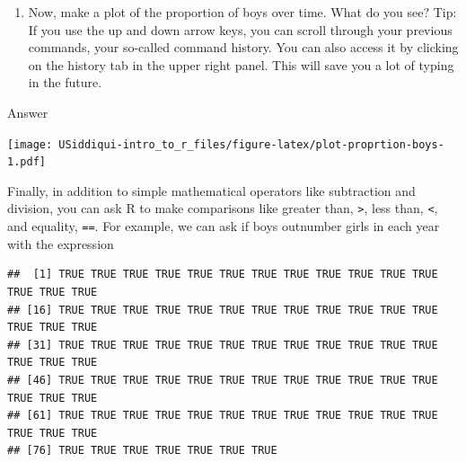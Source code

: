 \documentclass[
]{article}
\newenvironment{Shaded}{\begin{snugshade}}{\end{snugshade}}
\newcommand{\KeywordTok}[1]{\textcolor[rgb]{0.13,0.29,0.53}{\textbf{#1}}}
\newcommand{\NormalTok}[1]{#1}
\newcommand{\OperatorTok}[1]{\textcolor[rgb]{0.81,0.36,0.00}{\textbf{#1}}}
\newcommand{\StringTok}[1]{\textcolor[rgb]{0.31,0.60,0.02}{#1}}
\providecommand{\tightlist}{%
  \setlength{\itemsep}{0pt}\setlength{\parskip}{0pt}}
\begin{document}
\begin{enumerate}
\def\labelenumi{\arabic{enumi}.}
\setcounter{enumi}{2}
\tightlist
\item
  Now, make a plot of the proportion of boys over time. What do you see?
  Tip: If you use the up and down arrow keys, you can scroll through
  your previous commands, your so-called command history. You can also
  access it by clicking on the history tab in the upper right panel.
  This will save you a lot of typing in the future.
\end{enumerate}

{Answer}

\begin{Shaded}
\end{Shaded}

\texttt{[image: USiddiqui-intro\_to\_r\_files/figure-latex/plot-proprtion-boys-1.pdf]}

Finally, in addition to simple mathematical operators like subtraction
and division, you can ask R to make comparisons like greater than,
\texttt{\textgreater{}}, less than, \texttt{\textless{}}, and equality,
\texttt{==}. For example, we can ask if boys outnumber girls in each
year with the expression

\begin{Shaded}
\end{Shaded}

\begin{verbatim}
##  [1] TRUE TRUE TRUE TRUE TRUE TRUE TRUE TRUE TRUE TRUE TRUE TRUE TRUE TRUE TRUE
## [16] TRUE TRUE TRUE TRUE TRUE TRUE TRUE TRUE TRUE TRUE TRUE TRUE TRUE TRUE TRUE
## [31] TRUE TRUE TRUE TRUE TRUE TRUE TRUE TRUE TRUE TRUE TRUE TRUE TRUE TRUE TRUE
## [46] TRUE TRUE TRUE TRUE TRUE TRUE TRUE TRUE TRUE TRUE TRUE TRUE TRUE TRUE TRUE
## [61] TRUE TRUE TRUE TRUE TRUE TRUE TRUE TRUE TRUE TRUE TRUE TRUE TRUE TRUE TRUE
## [76] TRUE TRUE TRUE TRUE TRUE TRUE TRUE
\end{verbatim}
\end{document}
